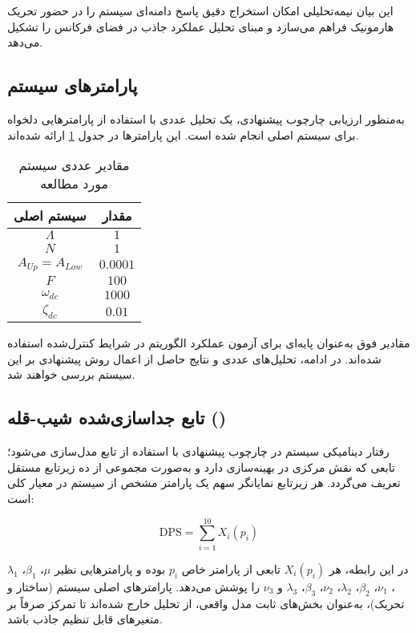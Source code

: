 این بیان نیمه‌تحلیلی امکان استخراج دقیق پاسخ دامنه‌ای سیستم را در حضور تحریک هارمونیک فراهم می‌سازد و مبنای تحلیل عملکرد جاذب در فضای فرکانس را تشکیل می‌دهد.


\subsection{پارامترهای سیستم}

به‌منظور ارزیابی چارچوب پیشنهادی، یک تحلیل عددی با استفاده از پارامترهایی دلخواه برای سیستم اصلی انجام شده است. این پارامترها در جدول \ref{tab:main-system-parameters} ارائه شده‌اند.

\begin{table}[H]
\centering
\caption{ مقادیر عددی سیستم مورد مطالعه}
\label{tab:main-system-parameters}
\begin{tabular}{cc}
\hline
سیستم اصلی & مقدار \\
\hline
$\Lambda$ & $1$ \\
$N$ & $1$ \\
$A_{Up} = A_{Low}$ & $0.0001$ \\
$F$ & $100$ \\
$\omega_{dc}$ & $1000$ \\
$\zeta_{dc}$ & $0.01$ \\
\hline
\end{tabular}
\end{table}

مقادیر فوق به‌عنوان پایه‌ای برای آزمون عملکرد الگوریتم  در شرایط کنترل‌شده استفاده شده‌اند. در ادامه، تحلیل‌های عددی و نتایج حاصل از اعمال روش پیشنهادی بر این سیستم بررسی خواهند شد.


\subsection{تابع جداسازی‌شده شیب-قله ()}

رفتار دینامیکی سیستم در چارچوب پیشنهادی با استفاده از تابع  مدل‌سازی می‌شود؛ تابعی که نقش مرکزی در بهینه‌سازی دارد و به‌صورت مجموعی از ده زیرتابع مستقل تعریف می‌گردد. هر زیرتابع نمایانگر سهم یک پارامتر مشخص از سیستم در معیار کلی  است:

\begin{equation}
\mathrm{DPS} = \sum_{i=1}^{10} X_i(p_i)
\end{equation}

در این رابطه، هر $X_i(p_i)$ تابعی از پارامتر خاص $p_i$ بوده و پارامترهایی نظیر $\mu$، $\beta_1$، $\lambda_1$، $\nu_1$، $\beta_2$، $\lambda_2$، $\nu_2$، $\beta_3$، $\lambda_3$ و $\nu_3$ را پوشش می‌دهد. پارامترهای اصلی سیستم (ساختار و تحریک)، به‌عنوان بخش‌های ثابت مدل واقعی، از تحلیل خارج شده‌اند تا تمرکز صرفاً بر متغیرهای قابل تنظیم جاذب باشد.

